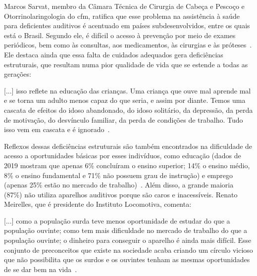 Marcos Sarvat, membro da Câmara Técnica de Cirurgia de Cabeça e Pescoço e Otorrinolaringologia do \acrfull{cfm}, ratifica que esse problema na assistência à saúde para deficientes auditivos é acentuado em países subdesenvolvidos, entre os quais está o Brasil. Segundo ele, é difícil o acesso à prevenção por meio de exames periódicos, bem como às consultas, aos medicamentos, às cirurgias e às próteses~\cite{ebc-2021-oms-estima}. Ele destaca ainda que essa falta de cuidados adequados gera deficiências estruturais, que resultam numa pior qualidade de vida que se estende a todas as gerações:


\begin{citacao}
    {[...]} isso reflete na educação das crianças. Uma criança que ouve mal aprende mal e se torna um adulto menos capaz do que seria, e assim por diante. Temos uma cascata de efeitos do idoso abandonado, do idoso solitário, da depressão, da perda de motivação, do desvínculo familiar, da perda de condições de trabalho. Tudo isso vem em cascata e é ignorado~\cite{ebc-2021-oms-estima}.
\end{citacao}

Reflexos dessas deficiências estruturais são também encontrados na dificuldade de acesso a oportunidades básicas por esses indivíduos, como educação (dados de 2019 mostram que apenas 6\% concluíram o ensino superior; 14\% o ensino médio, 8\% o ensino fundamental e 71\% não possuem grau de instrução) e emprego (apenas 25\% estão no mercado de trabalho)~\cite{ibge-2021-pns}. Além disso, a grande maioria (87\%) não utiliza aparelhos auditivos porque são caros e inacessíveis. Renato Meirelles, que é presidente do Instituto Locomotiva, comenta:

\begin{citacao}
    {[...]} como a população surda teve menos oportunidade de estudar do que a população ouvinte; como tem mais dificuldade no mercado de trabalho do que a população ouvinte; o dinheiro para conseguir o aparelho é ainda mais difícil. Esse conjunto de preconceitos que existe na sociedade acaba criando um círculo vicioso que não possibilita que os surdos e os ouvintes tenham as mesmas oportunidades de se dar bem na vida~\cite{ebc-2019-10-milhoes-pessoas}.
\end{citacao}


